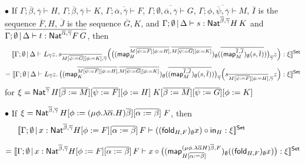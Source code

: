 \documentclass{lmcs}
\theoremstyle{plain}\newtheorem{satz}[thm]{Satz}
\newcommand{\fold}{\mathsf{fold}}
\newcommand{\map}{\mathsf{map}}
\begin{document}
\vspace*{0.18in}

\noindent
$\bullet$\; If $\Gamma; \overline{\beta}, \overline{\gamma} \vdash
H$,\; $\Gamma; \overline{\beta}, \overline{\gamma} \vdash K$,\;
$\overline{\Gamma; \overline{\alpha}, \overline{\gamma} \vdash F}$,\;
$\overline{\Gamma; \emptyset, \overline{\alpha}, \overline{\gamma}
  \vdash G}$,\; 
$\overline{\Gamma; \phi, \overline{\psi}, \overline{\gamma} \vdash
  M}$,\; $\overline{I}$ is the sequence $\overline{F}, H$,\;
$\overline{J}$ is the sequence $\overline{G}, K$, and $\Gamma;
\emptyset\,|\,\Delta \vdash s : \mathsf{Nat}^{\overline{\beta},
  \overline{\gamma}} H\, K$ and $\overline{\Gamma; \emptyset \,|\,\Delta \vdash
  t : \mathsf{Nat}^{\overline{\alpha}, \overline{\gamma}} F\, G}$, then
\[\hspace*{0.13in}\setsem{\Gamma; \emptyset \,|\, \Delta
    \vdash L_{\overline{\gamma}} z.\,
    s_{\overline{M [\overline{\psi := G}] [\phi := K]},
      \overline{\gamma}} \Big(\big( (\map_{H}^{\overline{M
        [\overline{\psi := F}] [\phi := H]}, \overline{M
        [\overline{\psi := G}] [\phi := K]}})_\emptyset
    (\overline{(\map_{M}^{\overline{I}, \overline{J}})_\emptyset
      (s, \overline{t})}) \big)_{\overline{\gamma}} z \Big) : \xi}\]
\[= \setsem{\Gamma; \emptyset\,|\, \Delta \vdash
    L_{\overline{\gamma}} z.\, \big( (\map_{K}^{\overline{M
      [\overline{\psi := F}] [\phi := H]}, \overline{M [\overline{\psi
          := G}] [\phi := K]}})_\emptyset (\overline{(\map_{M}^{\overline{I},
    \overline{J}})_\emptyset (s, \overline{t})}) \big)_{\overline{\gamma}} \Big(
s_{\overline{M [\overline{\psi := F}] [\phi := H]}, \overline{\gamma}}
z \Big) : \xi}\] for $\xi = \mathsf{Nat}^{\overline{\gamma}}\,
  H[\overline{\beta:= M}] [\overline{\psi := F}] [\phi := H]\;
  K[\overline{\beta := M}] [\overline{\psi := G}] [\phi := K]$

\vspace*{0.18in}

\noindent
$\bullet$\; If $\xi = \mathsf{Nat}^{\overline{\beta}, \overline{\gamma}}\,
H[\phi := (\mu \phi. \lambda
  \overline{\alpha}. H)\overline{\beta}][\overline{\alpha := \beta}]\;
F$, then
\[\hspace*{-0.72in}\setsem{\Gamma; \emptyset \,|\, x:
  \Nat^{\overline{\beta}, \overline{\gamma}} H[\phi :=
    F][\overline{\alpha := \beta}]\, F \vdash ((\fold_{H,
    F})_{\emptyset} x) \circ \tin_{H} : \xi}\]

\vspace*{-0.15in}

\[= \setsem{ \Gamma; \emptyset \,|\, x: \Nat^{\overline{\beta},
    \overline{\gamma}} H[\phi := F][\overline{\alpha := \beta}]\, F
  \vdash x \circ \big( (\map_{H [\ol{\alpha := \beta}]}^{(\mu
    \phi. \lambda \overline{\alpha} H) \overline{\beta},
    F})_\emptyset ((\fold_{H, F})_{\emptyset} x) \big) : \xi}\]
\end{document}
